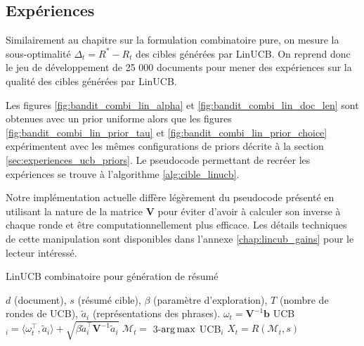 \subsection{Expériences}

Similairement au chapitre sur la formulation combinatoire pure,
on mesure la sous-optimalité $\Delta_t = R^* - R_t$ des cibles générées
par LinUCB.
On reprend donc le jeu de développement de 25 000 documents pour mener des expériences 
sur la qualité des cibles générées par LinUCB.

Les figures \ref{fig:bandit_combi_lin_alpha} et \ref{fig:bandit_combi_lin_doc_len} sont obtenues 
avec un prior uniforme alors que les figures \ref{fig:bandit_combi_lin_prior_tau} 
et \ref{fig:bandit_combi_lin_prior_choice} expérimentent avec les mêmes 
configurations de priors décrite à la section \ref{sec:experiences_ucb_priors}.
Le pseudocode permettant de recréer les expériences se trouve à l'algorithme 
\ref{alg:cible_linucb}.

Notre implémentation actuelle diffère légèrement du pseudocode présenté 
en utilisant la nature de la matrice $\mathbf{V}$ pour éviter d'avoir 
à calculer son inverse à chaque ronde et être computationnellement plus efficace.
Les détails techniques de cette manipulation sont disponibles dans l'annexe 
\ref{chap:lincub_gains} pour le lecteur intéressé.

\begin{algorithm}
    \caption{LinUCB combinatoire pour génération de résumé}
    \begin{algorithmic}[1]
        \Require $d$ (document), $s$ (résumé cible), $\beta$ (paramètre d'exploration), $T$ (nombre de rondes de UCB), $\tilde{a}_i$ (représentations des phrases).
        \State $\omega_t = \mathbf{V}^{-1}\mathbf{b}$
        \State UCB$_i = \langle \omega_t^\top, \tilde{a}_i \rangle + \sqrt{\beta\tilde{a}_i^\top \mathbf{V}^{-1} \tilde{a}_i}$
        \EndFor
        \State $\mathcal{M}_t =$ 3-$\operatorname*{arg\,max}$ UCB$_i$
        \State $X_t = R(\mathcal{M}_t, s)$
        \EndFor
        \EndFor
    \end{algorithmic}
    \label{alg:cible_linucb}
\end{algorithm}


